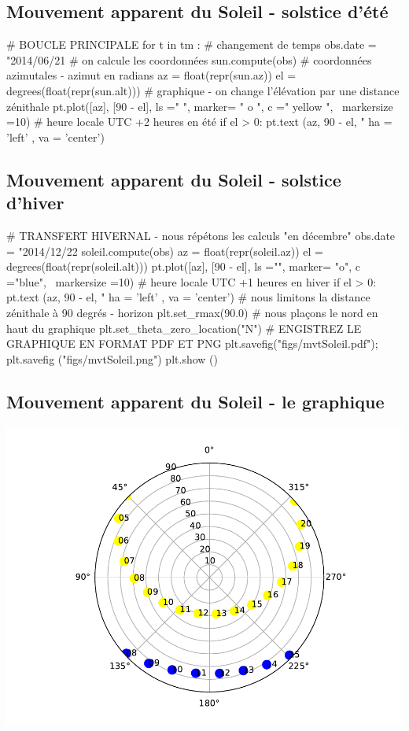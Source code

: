 \documentclass[%
oneside,                 %
final,                   %
10pt]{article}
\begin{document}
\subsection{Mouvement apparent du Soleil - solstice d'été}
\bpycod
# BOUCLE PRINCIPALE
for t in tm :
    # changement de temps
    obs.date = "2014/06/21 %
    # on calcule les coordonnées
    sun.compute(obs)
    # coordonnées azimutales - azimut en radians
    az = float(repr(sun.az))
    el = degrees(float(repr(sun.alt)))
    # graphique - on change l'élévation par une distance zénithale
    pt.plot([az], [90 - el], ls =" ", marker= " o ", c =" yellow ", \
    markersize =10)
    # heure locale UTC +2 heures en été
    if el > 0:
        pt.text (az, 90 - el, " %
        ha = 'left' , va = 'center')
\epycod
\subsection{Mouvement apparent du Soleil - solstice d'hiver}
\bpycod
    # TRANSFERT HIVERNAL - nous répétons les calculs "en décembre"
    obs.date = "2014/12/22 %
    soleil.compute(obs)
    az = float(repr(soleil.az))
    el = degrees(float(repr(soleil.alt)))
    pt.plot([az], [90 - el], ls ="", marker= "o", c ="blue", \
    markersize =10)
    # heure locale UTC +1 heures en hiver
    if el > 0:
        pt.text (az, 90 - el, "%
        ha = 'left' , va = 'center')
# nous limitons la distance zénithale à 90 degrés - horizon
plt.set_rmax(90.0)
# nous plaçons le nord en haut du graphique
plt.set_theta_zero_location("N")
# ENGISTREZ LE GRAPHIQUE EN FORMAT PDF ET PNG
plt.savefig("figs/mvtSoleil.pdf"); plt.savefig ("figs/mvtSoleil.png")
plt.show ()
\epycod

\subsection{Mouvement apparent du Soleil - le graphique}


\vspace{6mm}

\centerline{\includegraphics[width=0.9\linewidth]{figs/mvtSoleil.pdf}}
\end{document}
